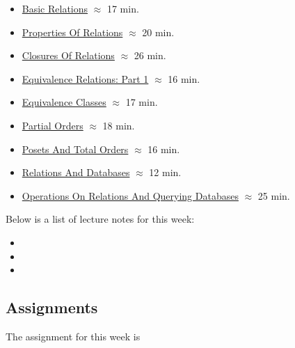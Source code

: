 \begin{itemize}
    \item \href{https://applied.cs.colorado.edu/mod/hvp/view.php?id=51853}{Basic Relations} $\approx$ 17 min.
    \item \href{https://applied.cs.colorado.edu/mod/hvp/view.php?id=51854}{Properties Of Relations} $\approx$ 20 min.
    \item \href{https://applied.cs.colorado.edu/mod/hvp/view.php?id=51855}{Closures Of Relations} $\approx$ 26 min.
    \item \href{https://applied.cs.colorado.edu/mod/hvp/view.php?id=51856}{Equivalence Relations: Part 1} $\approx$ 16 min.
    \item \href{https://applied.cs.colorado.edu/mod/hvp/view.php?id=51857}{Equivalence Classes} $\approx$ 17 min.
    \item \href{https://applied.cs.colorado.edu/mod/hvp/view.php?id=51858}{Partial Orders} $\approx$ 18 min.
    \item \href{https://applied.cs.colorado.edu/mod/hvp/view.php?id=51859}{Posets And Total Orders} $\approx$ 16 min.
    \item \href{https://applied.cs.colorado.edu/mod/hvp/view.php?id=51860}{Relations And Databases} $\approx$ 12 min.
    \item \href{https://applied.cs.colorado.edu/mod/hvp/view.php?id=51861}{Operations On Relations And Querying Databases} $\approx$ 25 min.
\end{itemize}

\noindent Below is a list of lecture notes for this week:

\begin{itemize}
    \item {}
    \item {}
    \item {}
\end{itemize}

\subsection{Assignments}

The assignment for this week is   

